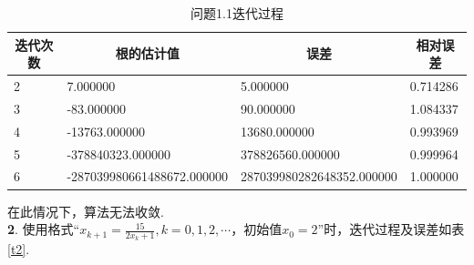 \documentclass[UTF8]{ctexart}
\begin{document}
\begin{table}[]
	\centering
	\caption{问题1.1迭代过程}
	\label{t1}
	\begin{tabular}{llll}
		\hline
		\multicolumn{1}{c}{\textbf{迭代次数}} & \multicolumn{1}{c}{\textbf{根的估计值}} & \multicolumn{1}{c}{\textbf{误差}} & \multicolumn{1}{c}{\textbf{相对误差}} \\ \hline
		2                                 & 7.000000                           & 5.000000                        & 0.714286                          \\ \hline
		3                                 & -83.000000                         & 90.000000                       & 1.084337                          \\ \hline
		4                                 & -13763.000000                      & 13680.000000                    & 0.993969                          \\ \hline
		5                                 & -378840323.000000                  & 378826560.000000                & 0.999964                          \\ \hline
		6                                 & -287039980661488672.000000         & 287039980282648352.000000       & 1.000000                          \\ \hline                         
	\end{tabular}
\end{table}
在此情况下，算法无法收敛.\\
\textbf{2}. 使用格式“$x_{k+1}=\frac{15}{2 x_{k}+1}, k=0,1,2, \cdots$，初始值$x_{0}=2$”时，迭代过程及误差如表\ref{t2}.\\
\end{document}

